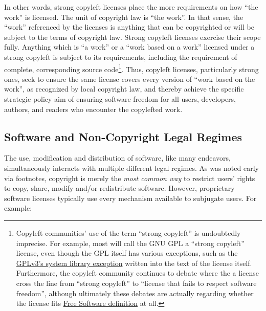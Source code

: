 In other words, strong copyleft licenses place the more requirements on how
``the work'' is licensed.  The unit of copyright law is ``the work''.  In
that sense, the ``work'' referenced by the licenses is anything that can be
copyrighted or will be subject to the terms of copyright law.  Strong
copyleft licenses exercise their scope fully.  Anything which is ``a work''
or a ``work based on a work'' licensed under a strong copyleft is subject to
its requirements, including the requirement of complete, corresponding source
code\footnote{Copyleft communities' use of the term ``strong copyleft'' is
  undoubtedly imprecise.  For example, most will call the GNU GPL a ``strong
  copyleft'' license, even though the GPL itself has various exceptions, such
  as the \hyperref[GPLv3-system-library-exception]{GPLv3's system library
    exception} written into the text of the license itself.  Furthermore, the
  copyleft community continues to debate where the a license cross the line
  from ``strong copyleft'' to ``license that fails to respect software
  freedom'', although ultimately these debates are actually regarding whether
  the license fits \hyperref[Free Software Definition]{Free Software
    definition} at all.}.  Thus, copyleft licenses, particularly strong ones,
seek to ensure the same license covers every version of ``work based on the
work'', as recognized by local copyright law, and thereby achieve the
specific strategic policy aim of ensuring software freedom for all users,
developers, authors, and readers who encounter the copylefted work.

\subsection{Software and Non-Copyright Legal Regimes}
\label{software-and-non-copyright}

The use, modification and distribution of software, like many endeavors,
simultaneously interacts with multiple different legal regimes.  As was noted
early via footnotes, copyright is merely the \textit{most common way} to
restrict users' rights to copy, share, modify and/or redistribute software.
However, proprietary software licenses typically use every mechanism
available to subjugate users.  For example:


